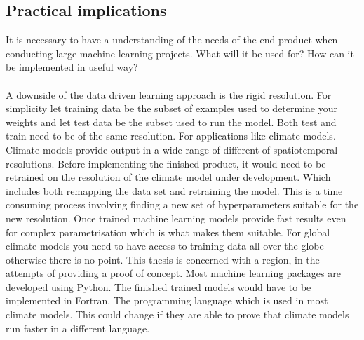
\subsection{Practical implications} \label{sec:practical_implications}
It is necessary to have a understanding of the needs of the end product when conducting large machine learning projects. What will it be used for? How can it be implemented in useful way?
\\ \\
A downside of the data driven learning approach is the rigid resolution. For simplicity let training data be the subset of examples used to determine your weights and let test data be the subset used to run the model. Both test and train need to be of the same resolution. For applications like climate models. Climate models provide output in a wide range of different of spatiotemporal resolutions. Before implementing the finished product, it would need to be retrained on the resolution of the climate model under development. Which includes both remapping the data set and retraining the model. This is a time consuming process involving finding a new set of hyperparameters suitable for the new resolution. %
Once trained machine learning models provide fast results even for complex parametrisation which is what makes them suitable. For global climate models you need to have access to training data all over the globe otherwise there is no point. This thesis is concerned with a region, in the attempts of providing a proof of concept. %
Most machine learning packages are developed using Python. The finished trained models would have to be implemented in Fortran. The programming language which is used in most climate models. This could change if they are able to prove that climate models run faster in a different language.
